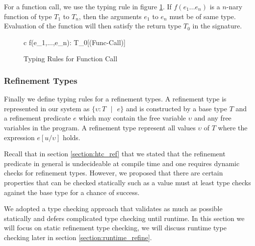 \documentclass[a4paper,12pt]{report}
\begin{document}
\par
For a function call, we use the typing rule in figure \ref{fig:type_check_f_call}. 
If $f(e_1...e_n)$ is a $n$-nary function of type $T_1$ to $T_n$, 
then the arguments $e_1$ to $e_n$ must be of same type. 
Evaluation of the function will then satisfy the return type $T_0$ in the signature. 

\begin{figure}[H]
  \begin{center}
    \begin{tabular} {c}
        {\Gamma \vdash f(e_1,\text{ }...\text{ },e_n): T_0}[(Func-Call)]
    \end{tabular}
  \end{center}
  \caption{Typing Rules for Function Call}
  \label{fig:type_check_f_call}
\end{figure}

\subsubsection{Refinement Types} \label{section:ref_type_check}
Finally we define typing rules for a refinement types. A refinement type 
is represented in our system as $\{\upsilon : T\text{ }|\text{ }e\}$ and is 
constructed by a base type $T$ and a refinement predicate $e$ which may contain 
the free variable $\upsilon$ and any free variables in the program. A refinement 
type represent all values $\upsilon$ of $T$ where the expression $e[u/\upsilon]$ holds. 

\par
Recall that in section \ref{section:htc_ref} that we stated that the refinement 
predicate in general is undecideable at compile time and one requires dynamic 
checks for refinement types. However, we proposed that there are certain 
properties that can be checked statically such as a value must at least 
type checks against the base type for a chance of success. 

\par
We adopted a type checking approach that validates as much as possible 
statically and defers complicated type 
checking until runtime. In this section we will focus on static refinement type 
checking, we will discuss runtime type checking later in section 
\ref{section:runtime_refine}.
\end{document}
